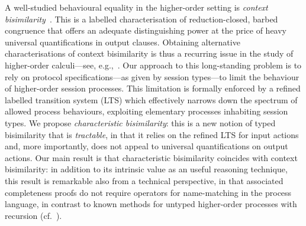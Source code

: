 
A well-studied behavioural equality in the higher-order setting 
is \emph{context bisimilarity}~\cite{San96H}. This is 
a labelled characterisation of reduction-closed, barbed congruence 
that offers an adequate distinguishing power at the price of heavy universal quantifications in output clauses.
Obtaining alternative characterisations of context bisimilarity
is thus a recurring issue 
in the study of higher-order calculi---see, e.g.,~\cite{SangiorgiD:expmpa,San96H,JeffreyR05,DBLP:journals/cl/KoutavasH12}. 
Our approach 
to this long-standing problem is to 
rely on protocol specifications---as given by session types---to limit 
the behaviour of higher-order session processes. 
This limitation is formally enforced by 
a refined labelled transition system (LTS)
which effectively 
narrows down the spectrum of allowed process behaviours, 
exploiting elementary processes inhabiting session types.
We propose \emph{characteristic bisimilarity}: this is 
a new notion of typed bisimilarity that is 
\emph{tractable}, in that 
it relies on the refined LTS for input actions and, more importantly, 
does not appeal to universal quantifications on output actions. 
Our main result is that characteristic  %
bisimilarity coincides with context bisimilarity:
in addition to its intrinsic value as an useful reasoning technique, this result is remarkable 
also from a technical perspective, in that associated 
completeness proofs do not require 
operators for 
name-matching in the process language, in contrast to known methods for untyped higher-order processes
with recursion (cf.~\cite{JeffreyR05}).


